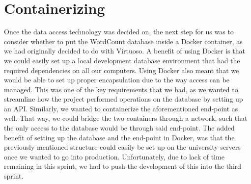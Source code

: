 \section{Containerizing}
Once the data access technology was decided on, the next step for us was to consider whether to put the WordCount database inside a Docker container, as we had originally decided to do with Virtuoso. A benefit of using Docker is that we could easily set up a local development database environment that had the required dependencies on all our computers. Using Docker also meant that we would be able to set up proper encapsulation due to the way access can be managed. This was one of the key requirements that we had, as we wanted to streamline how the \knox{} project performed operations on the database by setting up an API. 
Similarly, we wanted to containerize the aforementioned end-point as well. That way, we could bridge the two containers through a network, such that the only access to the database would be through said end-point.
The added benefit of setting up the database and the end-point in Docker, was that the previously mentioned structure could easily be set up on the university servers once we wanted to go into production.
Unfortunately, due to lack of time remaining in this sprint, we had to push the development of this into the third sprint.